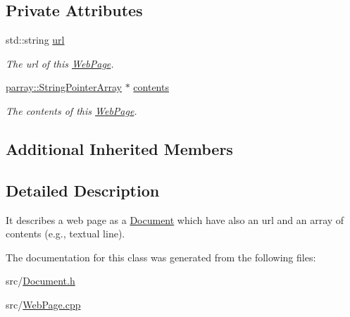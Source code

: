 \subsection*{Private Attributes}
\begin{DoxyCompactItemize}
\item 
\hypertarget{classdocs_1_1WebPage_a4495e463a26d77b22ec4d8af690bbb11}{std\-::string \hyperlink{classdocs_1_1WebPage_a4495e463a26d77b22ec4d8af690bbb11}{url}}\label{classdocs_1_1WebPage_a4495e463a26d77b22ec4d8af690bbb11}

\begin{DoxyCompactList}\small\item\em The url of this \hyperlink{classdocs_1_1WebPage}{Web\-Page}. \end{DoxyCompactList}\item 
\hypertarget{classdocs_1_1WebPage_a67d46a145ff4e7093fb1b8f56e539895}{\hyperlink{classparray_1_1StringPointerArray}{parray\-::\-String\-Pointer\-Array} $\ast$ \hyperlink{classdocs_1_1WebPage_a67d46a145ff4e7093fb1b8f56e539895}{contents}}\label{classdocs_1_1WebPage_a67d46a145ff4e7093fb1b8f56e539895}

\begin{DoxyCompactList}\small\item\em The contents of this \hyperlink{classdocs_1_1WebPage}{Web\-Page}. \end{DoxyCompactList}\end{DoxyCompactItemize}
\subsection*{Additional Inherited Members}


\subsection{Detailed Description}
It describes a web page as a \hyperlink{classdocs_1_1Document}{Document} which have also an url and an array of contents (e.\-g., textual line). 

The documentation for this class was generated from the following files\-:\begin{DoxyCompactItemize}
\item 
src/\hyperlink{Document_8h}{Document.\-h}\item 
src/\hyperlink{WebPage_8cpp}{Web\-Page.\-cpp}\end{DoxyCompactItemize}
